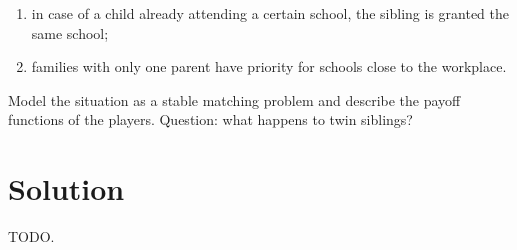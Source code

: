 \documentclass{article}
\begin{document}
\begin{enumerate}
    \item in case of a child already attending a certain school, the sibling is granted the same school; 
    \item families with only one parent have priority for schools close to the workplace.
\end{enumerate}

Model the situation as a stable matching problem and describe the payoff functions of the players. Question: what happens to twin siblings?  

\section{Solution}

TODO.
\end{document}
